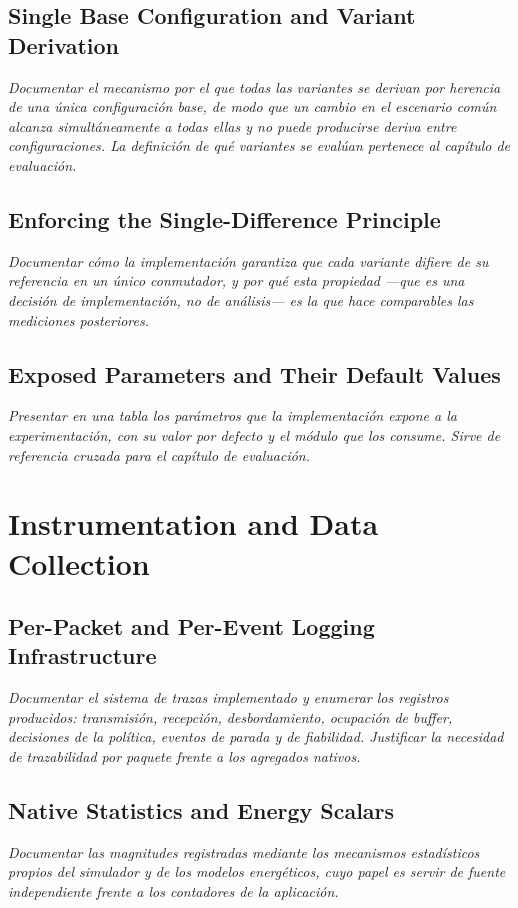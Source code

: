 \subsection{Single Base Configuration and Variant Derivation}
\emph{Documentar el mecanismo por el que todas las variantes se derivan por
herencia de una única configuración base, de modo que un cambio en el escenario
común alcanza simultáneamente a todas ellas y no puede producirse deriva entre
configuraciones. La definición de qué variantes se evalúan pertenece al capítulo
de evaluación.}

\subsection{Enforcing the Single-Difference Principle}
\emph{Documentar cómo la implementación garantiza que cada variante difiere de su
referencia en un único conmutador, y por qué esta propiedad —que es una decisión
de implementación, no de análisis— es la que hace comparables las mediciones
posteriores.}

\subsection{Exposed Parameters and Their Default Values}
\emph{Presentar en una tabla los parámetros que la implementación expone a la
experimentación, con su valor por defecto y el módulo que los consume. Sirve de
referencia cruzada para el capítulo de evaluación.}

\section{Instrumentation and Data Collection}

\subsection{Per-Packet and Per-Event Logging Infrastructure}
\emph{Documentar el sistema de trazas implementado y enumerar los registros
producidos: transmisión, recepción, desbordamiento, ocupación de buffer,
decisiones de la política, eventos de parada y de fiabilidad. Justificar la
necesidad de trazabilidad por paquete frente a los agregados nativos.}

\subsection{Native Statistics and Energy Scalars}
\emph{Documentar las magnitudes registradas mediante los mecanismos estadísticos
propios del simulador y de los modelos energéticos, cuyo papel es servir de
fuente independiente frente a los contadores de la aplicación.}


